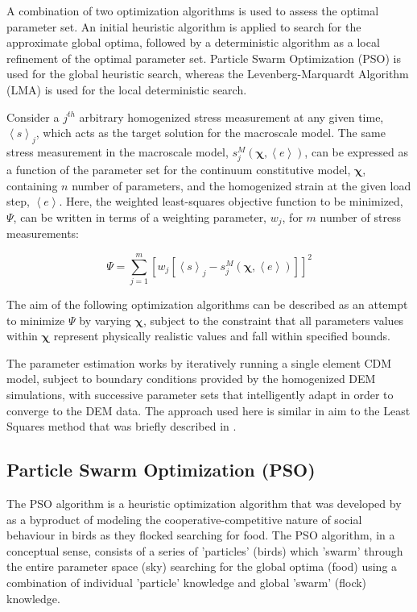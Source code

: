 A combination of two optimization algorithms is used to assess the optimal parameter set. An initial heuristic algorithm is applied to search for the approximate global optima, followed by a deterministic algorithm as a local refinement of the optimal parameter set. Particle Swarm Optimization (PSO) is used for the global heuristic search, whereas the Levenberg-Marquardt Algorithm (LMA) is used for the local deterministic search. 

Consider a $j^{th}$ arbitrary homogenized stress measurement at any given time, $\left< s \right>_j$, which acts as the target solution for the macroscale model. The same stress measurement in the macroscale model, $s^M_j \left(\boldsymbol{\chi}, \left< e \right>\right)$, can be expressed as a function of the parameter set for the continuum constitutive model, $\boldsymbol{\chi}$, containing $n$ number of parameters, and the homogenized strain at the given load step, $\left< e \right>$. Here, the weighted least-squares objective function to be minimized, $\Psi$, can be written in terms of a weighting parameter, $w_j$, for $m$ number of stress measurements:

\begin{equation}
\Psi=\sum_{j=1}^m\left[w_j\left[\left< s \right>_j-s^M_j \left(\boldsymbol{\chi}, \left< e \right>\right)\right]\right]^2
\label{eqn:lma2}
\end{equation}

The aim of the following optimization algorithms can be described as an attempt to minimize $\Psi$ by varying $\boldsymbol{\chi}$, subject to the constraint that all parameters values within $\boldsymbol{\chi}$ represent physically realistic values and fall within specified bounds.

The parameter estimation works by iteratively running a single element CDM model, subject to boundary conditions provided by the homogenized DEM simulations, with successive parameter sets that intelligently adapt in order to converge to the DEM data. The approach used here is similar in aim to the Least Squares method that was briefly described in \citet{marquardt_algorithm_1963}.

\subsection{Particle Swarm Optimization (PSO)}

The PSO algorithm is a heuristic optimization algorithm that was developed by \citet{Kennedy} as a byproduct of modeling the cooperative-competitive nature of social behaviour in birds as they flocked searching for food. The PSO algorithm, in a conceptual sense, consists of a series of 'particles' (birds) which 'swarm' through the entire parameter space (sky) searching for the global optima (food) using a combination of individual 'particle' knowledge and global 'swarm' (flock) knowledge.

